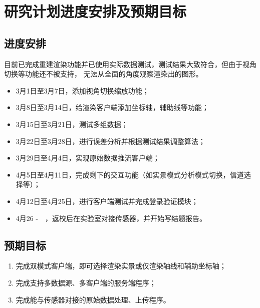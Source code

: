 \section{研究计划进度安排及预期目标}

\subsection{进度安排}

目前已完成重建渲染功能并已使用实际数据测试，测试结果大致符合，但由于视角切换等功能还不被支持，
无法从全面的角度观察渲染出的图形。

\begin{itemize}
    \item 3月1日至3月7日，添加视角切换缩放功能；
    \item 3月8日至3月14日，给渲染客户端添加坐标轴，辅助线等功能；
    \item 3月15日至3月21日，测试多组数据；
    \item 3月22日至3月28日，进行误差分析并根据测试结果调整算法；
    \item 3月29日至4月4日，实现原始数据推流客户端；
    \item 4月5日至4月11日，完成剩下的交互功能（如实景模式分析模式切换，信道选择等）；
    \item 4月12日至4月25日，进行客户端测试并完成登录验证模块；
    \item 4月26 -　，返校后在实验室对接传感器，并开始写结题报告。
\end{itemize}

\subsection{预期目标}

\begin{enumerate}
    \item 完成双模式客户端，即可选择渲染实景或仅渲染轴线和辅助坐标轴；
    \item 完成支持多数据源、多客户端的服务端程序；
    \item 完成能与传感器对接的原始数据处理、上传程序。
\end{enumerate}